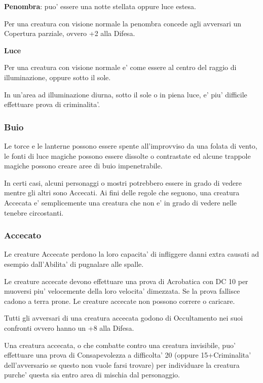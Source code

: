\documentclass[a4paper,11pt,twoside,openany]{dndbook}
\begin{document}
{\textbf{Penombra}: puo' essere una notte stellata oppure luce estesa.

Per una creatura con visione normale la penombra concede agli avversari
un Copertura parziale, ovvero +2 alla Difesa.

\textbf{Luce}

Per una creatura con visione normale e' come essere al centro del raggio di illuminazione, oppure sotto il sole.

In un'area ad illuminazione diurna, sotto il sole o in piena luce, e' piu' difficile effettuare prova di criminalita'.

\subsubsection{Buio}

\label{buio}

Le torce e le lanterne possono essere spente all'improvviso da una folata di vento, le fonti di luce magiche possono essere dissolte o contrastate ed alcune trappole magiche possono creare aree di buio impenetrabile.

In certi casi, alcuni personaggi o mostri potrebbero essere in grado di vedere mentre gli altri sono Accecati. Ai fini delle regole che seguono, una creatura Accecata e' semplicemente una creatura che non e' in grado di vedere nelle tenebre circostanti.

\subsubsection{Accecato}

\label{accecato}

Le creature Accecate perdono la loro capacita' di infliggere danni extra causati ad esempio dall'Abilita' di pugnalare alle spalle.

Le creature accecate devono effettuare una prova di Acrobatica con DC 10 per muoversi piu' velocemente della loro velocita' dimezzata. Se la prova fallisce cadono a terra prone. Le creature accecate non possono correre o caricare.

Tutti gli avversari di una creatura accecata godono di Occultamento nei suoi confronti ovvero hanno un +8 alla Difesa.

Una creatura accecata, o che combatte contro una creatura invisibile, puo' effettuare una prova di Consapevolezza a difficolta' 20 (oppure 15+Criminalita' dell'avversario se questo non vuole farsi trovare) per individuare la creatura purche' questa sia entro area di mischia dal personaggio.

}
\end{document}
